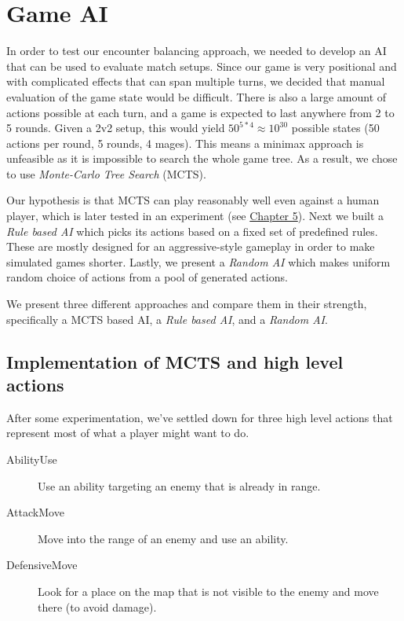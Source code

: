 \chapter{Game AI}
\label{chapter03}

In order to test our encounter balancing approach, we needed to develop an
AI that can be used to evaluate match setups. Since our game is very
positional and with complicated effects that can span multiple turns, we
decided that manual evaluation of the game state would be difficult. There
is also a large amount of actions possible at each turn, and a game is expected
to last anywhere from 2 to 5 rounds. Given a 2v2 setup, this would yield
$50^{5*4} \approx 10^{30}$ possible states (50 actions per round, 5 rounds, 4 mages).
This means a minimax approach is unfeasible as it is impossible to search the whole
game tree. As a result, we chose to use \emph{Monte-Carlo Tree Search} (MCTS).

Our hypothesis is that MCTS can play reasonably well even against a human player,
which is later tested in an experiment (see \hyperref[chapter05]{Chapter 5}).
Next we built a \emph{Rule based AI} which picks
its actions based on a fixed set of predefined rules. These are mostly
designed for an aggressive-style gameplay in order to make simulated games
shorter. Lastly, we present a \emph{Random AI} which makes uniform random
choice of actions from a pool of generated actions.

We present three different approaches and compare them in their strength,
specifically a MCTS based AI, a \emph{Rule based AI}, and a \emph{Random
	AI}.

\section{Implementation of MCTS and high level actions}

After some experimentation, we've settled down for three high level actions
that represent most of what a player might want to do.

\begin{description}
\item [AbilityUse] Use an ability targeting an enemy that is already in range.
\item [AttackMove] Move into the range of an enemy and use an ability.
\item [DefensiveMove] Look for a place on the map that is not visible to the enemy and move there (to avoid damage).
\end{description}


